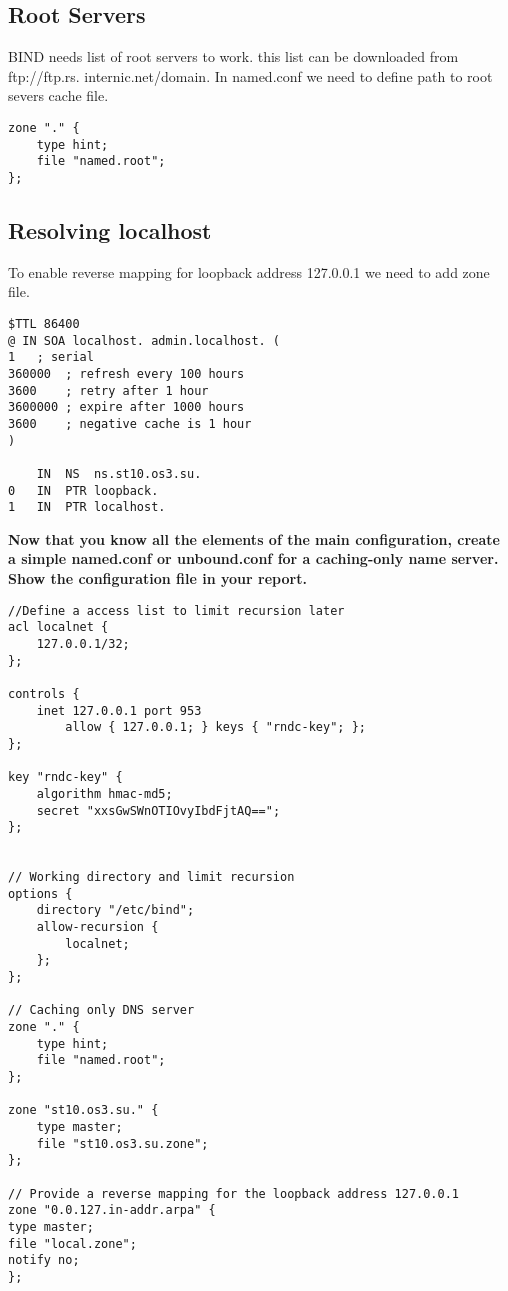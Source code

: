 \documentclass[a4paper,11pt]{article}
\theoremstyle{mytheor}
\begin{document}
\subsection{Root Servers}
BIND needs list of root servers to work. this list can be downloaded from ftp://ftp.rs.
internic.net/domain. In named.conf we need to define path to root severs cache file.

\begin{lstlisting}
zone "." {
    type hint;
    file "named.root";
};
\end{lstlisting}

\subsection{Resolving localhost}
To enable reverse mapping for loopback address 127.0.0.1 we need to add zone file.
\begin{lstlisting}[]
$TTL 86400
@ IN SOA localhost. admin.localhost. (
1   ; serial
360000  ; refresh every 100 hours
3600    ; retry after 1 hour
3600000 ; expire after 1000 hours
3600    ; negative cache is 1 hour
)

    IN  NS  ns.st10.os3.su.
0   IN  PTR loopback.
1   IN  PTR localhost.
\end{lstlisting}

\textbf{Now that you know all the elements of the main configuration, create
a simple named.conf or unbound.conf for a caching-only name server.
Show the configuration file in your report.}\\

\begin{lstlisting}
//Define a access list to limit recursion later
acl localnet {
    127.0.0.1/32;
};

controls {
    inet 127.0.0.1 port 953
        allow { 127.0.0.1; } keys { "rndc-key"; };
};

key "rndc-key" {
    algorithm hmac-md5;
    secret "xxsGwSWnOTIOvyIbdFjtAQ==";
};


// Working directory and limit recursion
options {
    directory "/etc/bind";
    allow-recursion {
        localnet;
    };
};

// Caching only DNS server
zone "." {
    type hint;
    file "named.root";
};

zone "st10.os3.su." {
    type master;
    file "st10.os3.su.zone";
};

// Provide a reverse mapping for the loopback address 127.0.0.1
zone "0.0.127.in-addr.arpa" {
type master;
file "local.zone";
notify no;
};
\end{lstlisting}
\end{document}
